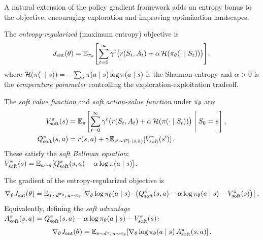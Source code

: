 \documentclass[11pt,a4paper]{article}
\begin{document}
A natural extension of the policy gradient framework adds an entropy
bonus to the objective, encouraging exploration and improving
optimization landscapes.

\begin{definition}
\label{def:entropy-objective}
The \emph{entropy-regularized} (maximum entropy) objective is
\[
  J_{\mathrm{ent}}(\theta) = \mathbb{E}_{\pi_\theta}\!\left[\sum_{t=0}^\infty
  \gamma^t \bigl(r(S_t, A_t) + \alpha\, \mathcal{H}(\pi_\theta
  (\cdot \mid S_t))\bigr)\right],
\]
where $\mathcal{H}(\pi(\cdot \mid s)) = -\sum_a \pi(a \mid s)
\log \pi(a \mid s)$ is the Shannon entropy and $\alpha > 0$ is
the \emph{temperature parameter} controlling the exploration-exploitation
tradeoff.
\end{definition}

\begin{definition}
\label{def:soft-values}
The \emph{soft value function} and \emph{soft action-value function}
under $\pi_\theta$ are:
\begin{align*}
  V^{\pi}_{\mathrm{soft}}(s) &= \mathbb{E}_\pi\!\left[\sum_{t=0}^\infty
  \gamma^t \bigl(r(S_t, A_t) + \alpha\, \mathcal{H}(\pi(\cdot \mid S_t))
  \bigr) \;\middle|\; S_0 = s\right], \\
  Q^{\pi}_{\mathrm{soft}}(s,a) &= r(s,a) + \gamma
  \mathbb{E}_{s' \sim \mathcal{P}(\cdot \mid s,a)}\!\left[V^{\pi}_{\mathrm{soft}}(s')
  \right].
\end{align*}
These satisfy the \emph{soft Bellman equation}:
$V^{\pi}_{\mathrm{soft}}(s) = \mathbb{E}_{a \sim \pi}\!\left[
Q^{\pi}_{\mathrm{soft}}(s,a) - \alpha \log \pi(a \mid s)\right]$.
\end{definition}

\begin{theorem}
\label{thm:soft-pg}
The gradient of the entropy-regularized objective is
\[
  \nabla_\theta J_{\mathrm{ent}}(\theta) =
  \mathbb{E}_{s \sim d^{\pi_\theta},\, a \sim \pi_\theta}\!\left[
  \nabla_\theta \log \pi_\theta(a \mid s) \cdot
  \bigl(Q^{\pi}_{\mathrm{soft}}(s,a) - \alpha \log \pi_\theta(a \mid s)
  - V^{\pi}_{\mathrm{soft}}(s)\bigr)\right].
\]
Equivalently, defining the \emph{soft advantage}
$A^{\pi}_{\mathrm{soft}}(s,a) = Q^{\pi}_{\mathrm{soft}}(s,a)
- \alpha \log \pi_\theta(a \mid s) - V^{\pi}_{\mathrm{soft}}(s)$:
\[
  \nabla_\theta J_{\mathrm{ent}}(\theta) =
  \mathbb{E}_{s \sim d^{\pi},\, a \sim \pi_\theta}\!\left[
  \nabla_\theta \log \pi_\theta(a \mid s)\,
  A^{\pi}_{\mathrm{soft}}(s,a)\right].
\]
\end{theorem}
\end{document}
